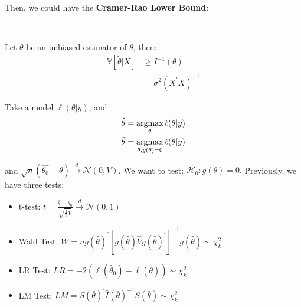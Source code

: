 Then, we could have the \textbf{Cramer-Rao Lower Bound}:
\begin{definition}
    \ 

    Let $\tilde{\theta }$ be an unbiased estimator of $\theta $, then:
    \begin{align*}
        \mathbb{V}[\tilde{\theta }|X] &\geq I^{-1}(\theta )\\
        &= \sigma^2 (X^{\prime}X)^{-1}
    \end{align*}
\end{definition}

Take a model $\ell(\theta |y)$, and
\begin{align*}
    \hat{\theta} &= \operatorname*{arg max}_{\theta}\ell(\theta|y) \\
    \bar{\theta} &= \operatorname*{arg max}_{\theta, g(\theta)=0} \ell(\theta|y)
\end{align*}

and $\sqrt{n}(\hat{\theta_0} - \theta) \overset{d}{\rightarrow} \mathcal{N}(0, V)$. 
We want to test: $\mathcal{H}_0: g(\theta)=0.$
Previously, we have three tests:
\begin{itemize}
    \item t-test: $t = \frac{\hat{\theta} - \theta_0}{\sqrt{\frac{1}{n}\hat{V}}} \overset{d}{\rightarrow} \mathcal{N}(0, 1)$
    \item Wald Test: $W = n g(\hat{\theta})^{\prime} [g(\hat{\theta})\hat{V}g(\hat{\theta})^{\prime}]^{-1}g(\hat{\theta}) \sim \chi_k^2$
    \item LR Test: $LR = -2(\ell(\hat{\theta}_0) - \ell(\bar{\theta})) \sim \chi_k^2$
    \item LM Test: $LM = S(\bar{\theta})^{\prime}  \hat{I}(\bar{\theta})^{-1} S(\bar{\theta}) \sim \chi_k^2$
\end{itemize}

